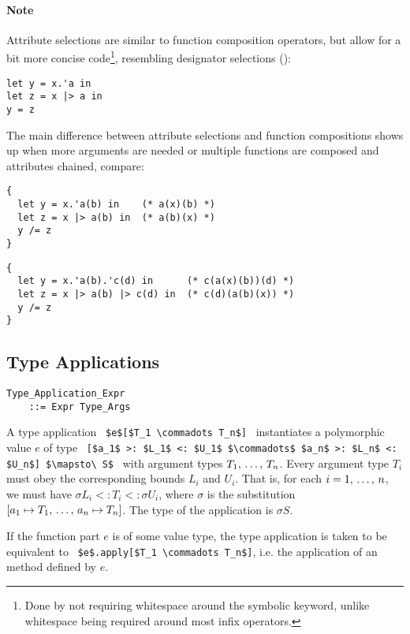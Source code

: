 \paragraph{Note}
Attribute selections are similar to function composition operators, but allow for a bit more concise code\footnote{Done by not requiring whitespace around the symbolic keyword, unlike whitespace being required around most infix operators.}, resembling designator selections ():
\begin{lstlisting}
let y = x.'a in
let z = x |> a in
y = z
\end{lstlisting}
The main difference between attribute selections and function compositions shows up when more arguments are needed or multiple functions are composed and attributes chained, compare: 
\begin{lstlisting}
{
  let y = x.'a(b) in    (* a(x)(b) *)
  let z = x |> a(b) in  (* a(b)(x) *)
  y /= z
}
\end{lstlisting}
\begin{lstlisting}
{
  let y = x.'a(b).'c(d) in      (* c(a(x)(b))(d) *)
  let z = x |> a(b) |> c(d) in  (* c(d)(a(b)(x)) *)
  y /= z
}
\end{lstlisting}





\subsection{Type Applications}
\label{sec:type-applications}

\grammar\begin{lstlisting}
Type_Application_Expr 
    ::= Expr Type_Args
\end{lstlisting}

A type application ~\lstinline!$e$[$T_1 \commadots T_n$]!~ instantiates a polymorphic value $e$ of type ~\lstinline![$a_1$ >: $L_1$ <: $U_1$ $\commadots$ $a_n$ >: $L_n$ <: $U_n$] $\mapsto\ S$!~ with argument types $T_1 ,\, \ldots ,\, T_n$. Every argument type $T_i$ must obey the corresponding bounds $L_i$ and $U_i$. That is, for each $i = 1 ,\, \ldots ,\, n$, we must have $\sigma L_i <: T_i <: \sigma U_i$, where $\sigma$ is the substitution $[a_1 \mapsto T_1 ,\, \ldots ,\, a_n \mapsto T_n]$. The type of the application is $\sigma S$. 

If the function part $e$ is of some value type, the type application is taken to be equivalent to ~\lstinline!$e$.apply[$T_1 \commadots T_n$]!, i.e. the application of an  method defined by $e$. 

